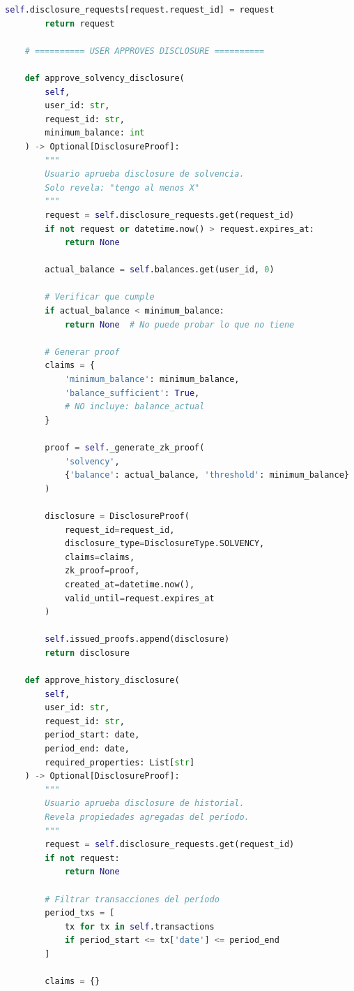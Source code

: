 \documentclass[11pt,a4paper,twoside]{book}
\theoremstyle{definition}
\theoremstyle{remark}
\begin{document}
\begin{lstlisting}[language=Python, caption={Sistema de Opt-in Transparency}]
        self.disclosure_requests[request.request_id] = request
        return request
    
    # ========== USER APPROVES DISCLOSURE ==========
    
    def approve_solvency_disclosure(
        self,
        user_id: str,
        request_id: str,
        minimum_balance: int
    ) -> Optional[DisclosureProof]:
        """
        Usuario aprueba disclosure de solvencia.
        Solo revela: "tengo al menos X"
        """
        request = self.disclosure_requests.get(request_id)
        if not request or datetime.now() > request.expires_at:
            return None
        
        actual_balance = self.balances.get(user_id, 0)
        
        # Verificar que cumple
        if actual_balance < minimum_balance:
            return None  # No puede probar lo que no tiene
        
        # Generar proof
        claims = {
            'minimum_balance': minimum_balance,
            'balance_sufficient': True,
            # NO incluye: balance_actual
        }
        
        proof = self._generate_zk_proof(
            'solvency',
            {'balance': actual_balance, 'threshold': minimum_balance}
        )
        
        disclosure = DisclosureProof(
            request_id=request_id,
            disclosure_type=DisclosureType.SOLVENCY,
            claims=claims,
            zk_proof=proof,
            created_at=datetime.now(),
            valid_until=request.expires_at
        )
        
        self.issued_proofs.append(disclosure)
        return disclosure
    
    def approve_history_disclosure(
        self,
        user_id: str,
        request_id: str,
        period_start: date,
        period_end: date,
        required_properties: List[str]
    ) -> Optional[DisclosureProof]:
        """
        Usuario aprueba disclosure de historial.
        Revela propiedades agregadas del período.
        """
        request = self.disclosure_requests.get(request_id)
        if not request:
            return None
        
        # Filtrar transacciones del período
        period_txs = [
            tx for tx in self.transactions
            if period_start <= tx['date'] <= period_end
        ]
        
        claims = {}
        

\end{lstlisting}
\end{document}
